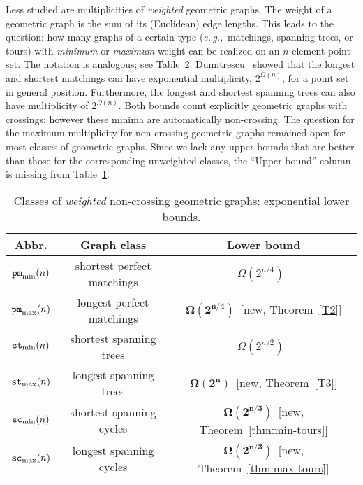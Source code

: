 \documentclass[11pt]{article}
\def\eg{{\it e.\,g.},~}
\def\sc{{\tt sc}}
\def\st{{\tt st}}
\def\pm{{\tt pm}}
\begin{document}
Less studied are multiplicities of {\em weighted} geometric graphs.
The weight of a geometric graph is the sum of its (Euclidean) edge lengths.
This leads to the question: how many graphs of a certain type
(\eg matchings, spanning trees, or tours)
with {\em minimum} or {\em maximum} weight can be realized on an $n$-element
point set. The notation is analogous; see Table~2. Dumitrescu~\cite{D02} showed that the longest and shortest
matchings can have exponential multiplicity, $2^{\Omega(n)}$, for a point
set in general position. Furthermore, the longest and shortest spanning trees
can also have multiplicity of $2^{\Omega(n)}$. Both bounds count
explicitly geometric graphs with crossings; however these minima are
automatically non-crossing. The question for the maximum multiplicity
for non-crossing geometric graphs remained open for most classes
of geometric graphs. Since we lack any upper bounds that are
better than those for the corresponding unweighted classes,
the ``Upper bound'' column is missing from Table~\ref{table2}.

\begin{table}[h]
\begin{center}
\begin{tabular}{|c|c|c|}
\hline
{\textbf {Abbr.}} & {\textbf {Graph class}} & {\textbf {Lower bound}}\\
\hline\hline
$\pm_{\rm min}(n)$ &shortest perfect matchings & $\Omega(2^{n/4})$~\cite{D02} \\
\hline
$\pm_{\rm max}(n)$ & longest perfect matchings & $\mathbf{\Omega(2^{n/4})}$~[new, Theorem~\ref{T2}] \\
\hline
$\st_{\rm min}(n)$ & shortest spanning trees & $\Omega(2^{n/2})$~\cite{D02} \\
\hline	
$\st_{\rm max}(n)$ & longest spanning trees & $\mathbf{\Omega(2^n)}$~[new, Theorem~\ref{T3}] \\
\hline	
$\sc_{\rm min}(n)$ & shortest spanning cycles & $\mathbf{\Omega(2^{n/3})}$~[new, Theorem~\ref{thm:min-tours}]\\
\hline
$\sc_{\rm max}(n)$ & longest spanning cycles & $\mathbf{\Omega(2^{n/3})}$~[new, Theorem~\ref{thm:max-tours}] \\
\hline
\end{tabular}
\caption{Classes of {\em weighted} non-crossing geometric
  graphs: exponential lower bounds.\label{table2}}
\end{center}
\vspace{-2\baselineskip}
\end{table}
\end{document}
